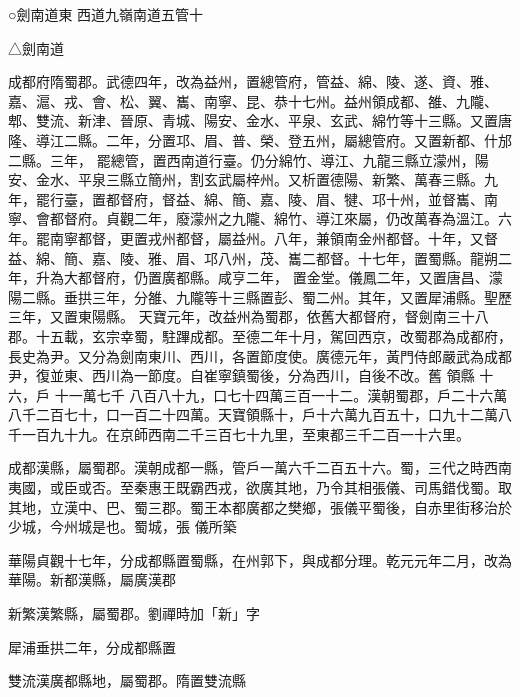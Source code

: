 
\begin{pinyinscope}

 ○劍南道東
 西道九嶺南道五管十



 △劍南道



 成都府隋蜀郡。武德四年，改為益州，置總管府，管益、綿、陵、遂、資、雅、嘉、滬、戎、會、松、翼、巂、南寧、昆、恭十七州。益州領成都、雒、九隴、郫、雙流、新津、晉原、青城、陽安、金水、平泉、玄武、綿竹等十三縣。又置唐隆、導江二縣。二年，分置邛、眉、普、榮、登五州，屬總管府。又置新都、什邡二縣。三年，
 罷總管，置西南道行臺。仍分綿竹、導江、九龍三縣立濛州，陽安、金水、平泉三縣立簡州，割玄武屬梓州。又析置德陽、新繁、萬春三縣。九年，罷行臺，置都督府，督益、綿、簡、嘉、陵、眉、犍、邛十州，並督巂、南寧、會都督府。貞觀二年，廢濛州之九隴、綿竹、導江來屬，仍改萬春為溫江。六年。罷南寧都督，更置戎州都督，屬益州。八年，兼領南金州都督。十年，又督益、綿、簡、嘉、陵、雅、眉、邛八州，茂、巂二都督。十七年，置蜀縣。龍朔二年，升為大都督府，仍置廣都縣。咸亨二年，
 置金堂。儀鳳二年，又置唐昌、濛陽二縣。垂拱三年，分雒、九隴等十三縣置彭、蜀二州。其年，又置犀浦縣。聖歷三年，又置東陽縣。
 天寶元年，改益州為蜀郡，依舊大都督府，督劍南三十八郡。十五載，玄宗幸蜀，駐蹕成都。至德二年十月，駕回西京，改蜀郡為成都府，長史為尹。又分為劍南東川、西川，各置節度使。廣德元年，黃門侍郎嚴武為成都尹，復並東、西川為一節度。自崔寧鎮蜀後，分為西川，自後不改。舊
 領縣
 十六，戶
 十一萬七千
 八百八十九，口七十四萬三百一十二。漢朝蜀郡，戶二十六萬八千二百七十，口一百二十四萬。天寶領縣十，戶十六萬九百五十，口九十二萬八千一百九十九。在京師西南二千三百七十九里，至東都三千二百一十六里。



 成都漢縣，屬蜀郡。漢朝成都一縣，管戶一萬六千二百五十六。蜀，三代之時西南夷國，或臣或否。至秦惠王既霸西戎，欲廣其地，乃令其相張儀、司馬錯伐蜀。取其地，立漢中、巴、蜀三郡。蜀王本都廣都之樊鄉，張儀平蜀後，自赤里街移治於少城，今州城是也。蜀城，張
 儀所築



 華陽貞觀十七年，分成都縣置蜀縣，在州郭下，與成都分理。乾元元年二月，改為華陽。新都漢縣，屬廣漢郡



 新繁漢繁縣，屬蜀郡。劉禪時加「新」字



 犀浦垂拱二年，分成都縣置



 雙流漢廣都縣地，屬蜀郡。隋置雙流縣




\end{pinyinscope}
